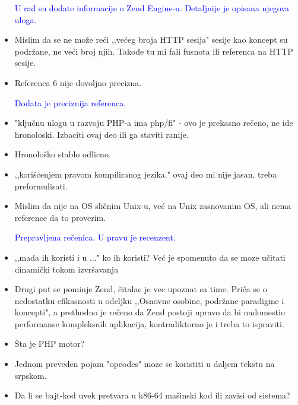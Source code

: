 \documentclass[a4paper]{report}
\newcommand{\odgovor}[1]{\textcolor{blue}{#1}}
\begin{document}
\begin{itemize}
\odgovor{U rad su dodate informacije o Zend Engine-u. Detaljnije je opisana njegova uloga.}

\item Mislim da se ne može reći ,,većeg broja HTTP sesija" sesije kao koncept su podržane, ne veći broj njih. Takođe tu mi fali fusnota ili referenca na HTTP sesije.

\odgovor{}

\item Referenca 6 nije dovoljno precizna.

\odgovor{Dodata je preciznija referenca.}

\item "ključnu ulogu u razvoju PHP-a ima php/fi" - ovo je prekasno rečeno, ne ide hronoloski. Izbaciti ovaj deo ili ga staviti ranije.

\odgovor{}

\item Hronološko stablo odlicno.
\item ,,korišćenjem pravom kompiliranog jezika." ovaj deo mi nije jasan, treba preformulisati.

\odgovor{}

\item Mislim da nije na OS sličnim Unix-u, već na Unix zasnovanim OS, ali nema reference da to proverim.

\odgovor{Prepravljena rečenica. U pravu je recenzent.}

\item ,,mada ih koristi i u ..." ko ih koristi? Već je spomenuto da se moze učitati dinamički tokom izvršavanja

\odgovor{}

\item Drugi put se pominje Zend, čitalac je vec upoznat sa time. Priča se o nedostatku efikasnosti u odeljku ,,Osnovne osobine, podržane paradigme i koncepti", a prethodno je rečeno da Zend postoji upravo da bi nadomestio performanse kompleksnih aplikacija, kontradiktorno je i treba to ispraviti.

\odgovor{}

\item Šta je PHP motor?

\odgovor{}

\item Jednom preveden pojam "opcodes" moze se koristiti u daljem tekstu na srpskom.

\odgovor{}

\item Da li se bajt-kod uvek pretvara u k86-64 mašinski kod ili zavisi od sistema?


\end{itemize}
\end{document}
